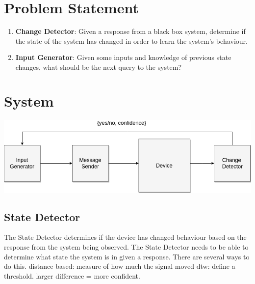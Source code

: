 \documentclass[11pt, a4paper]{article}
\begin{document}

\section*{Problem Statement} 

\begin{enumerate}
    \item \textbf{Change Detector}: Given a response from a black box system, determine if the state of the system has changed in order to learn the system's behaviour.
    \item \textbf{Input Generator}: Given some inputs and knowledge of previous state changes, what should be the next query to the system?
\end{enumerate}

\section*{System}

\includegraphics[scale=0.5]{change-detector.png}

\subsection*{State Detector}
The State Detector determines if the device has changed behaviour based on the response from the system being observed.
The State Detector needs to be able to determine what state the system is in given a response.
There are several ways to do this.
distance based: measure of how much the signal moved
dtw: define a threshold. larger difference = more confident.
\end{document}

